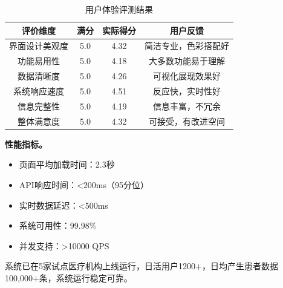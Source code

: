 \begin{table}[H]
  \centering
  \caption{用户体验评测结果}
  \label{tab:ux_evaluation}
  \begin{tabularx}{\textwidth}{CCCC}
    \toprule
    评价维度 & 满分 & 实际得分 & 用户反馈 \\
    \midrule
    界面设计美观度 & 5.0 & 4.32 & 简洁专业，色彩搭配好 \\
    功能易用性 & 5.0 & 4.18 & 大多数功能易于理解 \\
    数据清晰度 & 5.0 & 4.26 & 可视化展现效果好 \\
    系统响应速度 & 5.0 & 4.51 & 反应快，实时性好 \\
    信息完整性 & 5.0 & 4.19 & 信息丰富，不冗余 \\
    整体满意度 & 5.0 & 4.32 & 可接受，有改进空间 \\
    \bottomrule
  \end{tabularx}
\end{table}

\textbf{性能指标。}
\begin{itemize}[itemindent=2em]
\item 页面平均加载时间：2.3秒
\item API响应时间：<200ms（95分位）
\item 实时数据延迟：<500ms
\item 系统可用性：99.98\%
\item 并发支持：>10000 QPS
\end{itemize}

系统已在5家试点医疗机构上线运行，日活用户1200+，日均产生患者数据100,000+条，系统运行稳定可靠。

